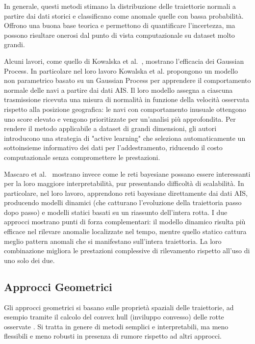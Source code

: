 In generale, questi metodi stimano la distribuzione delle traiettorie normali a partire dai dati storici e 
classificano come anomale quelle con bassa probabilità. 
Offrono una buona base teorica e permettono di quantificare l’incertezza, ma possono risultare onerosi 
dal punto di vista computazionale su dataset molto grandi.

Alcuni lavori, come quello di Kowalska et al.~\cite{kowalska}, mostrano l’efficacia dei Gaussian Process.
In particolare nel loro lavoro Kowalska et al. propongono un modello non parametrico basato su un Gaussian Process per apprendere
il comportamento normale delle navi a partire dai dati AIS. Il loro modello assegna a ciascuna trasmissione ricevuta 
una misura di normalità in funzione della velocità osservata rispetto alla posizione geografica:
le navi con comportamento inusuale ottengono uno score elevato e vengono prioritizzate per un'analisi più approfondita.
Per rendere il metodo applicabile a dataset di grandi dimensioni, gli autori introducono una strategia di
"active learning" che seleziona automaticamente un sottoinsieme informativo dei dati per
l'addestramento, riducendo il costo computazionale senza compromettere le prestazioni.

Mascaro et al.~\cite{mascaro} mostrano invece come le reti bayesiane possano essere interessanti per la
loro maggiore interpretabilità, pur presentando difficoltà di scalabilità.
In particolare, nel loro lavoro, apprendono reti bayesiane direttamente dai dati AIS, producendo
modelli dinamici (che catturano l'evoluzione della traiettoria passo dopo passo) e 
modelli statici basati su un riassunto dell'intera rotta. I due approcci mostrano punti di forza
complementari: il modello dinamico risulta più efficace nel rilevare anomalie localizzate nel
tempo, mentre quello statico cattura meglio pattern anomali che si manifestano sull'intera
traiettoria. La loro combinazione migliora le prestazioni complessive di rilevamento rispetto
all'uso di uno solo dei due.


\subsection{Approcci Geometrici}

Gli approcci geometrici si basano sulle proprietà spaziali delle traiettorie, 
ad esempio tramite il calcolo del convex hull (inviluppo convesso) delle rotte osservate \cite{riassuntone}. 
Si tratta in genere di metodi semplici e interpretabili, ma meno flessibili e meno robusti in presenza di 
rumore rispetto ad altri approcci.

